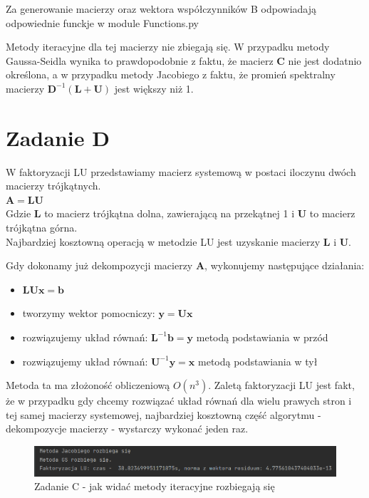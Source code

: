 \documentclass[fleqn]{article}
\begin{document}
    \noindent Za generowanie macierzy oraz wektora współczynników B odpowiadają
    odpowiednie funckje w module Functions.py

    \noindent Metody iteracyjne dla tej macierzy nie zbiegają się. W przypadku metody Gaussa-Seidla wynika
    to prawdopodobnie z faktu, że macierz \textbf{C} nie jest dodatnio określona, a w przypadku metody
    Jacobiego z faktu, że promień spektralny macierzy $\bm{D}^{-1}(\bm{L} + \bm{U})$ jest większy niż 1.

    \newpage
    \section{Zadanie D}
    W faktoryzacji LU przedstawiamy macierz systemową w postaci iloczynu dwóch macierzy trójkątnych. \\

    $\bm{A} = \bm{L}\bm{U}$ \\

    \noindent Gdzie \textbf{L} to macierz trójkątna dolna, zawierającą na przekątnej 1 i \textbf{U} to macierz trójkątna górna.\\
    Najbardziej kosztowną operacją w metodzie LU jest uzyskanie macierzy \textbf{L} i \textbf{U}.

    \noindent Gdy dokonamy już dekompozycji macierzy \textbf{A}, wykonujemy następujące działania:
    \begin{itemize}
        \item $\bm{L}\bm{U}\bm{x} = \bm{b}$
        \item tworzymy wektor pomocniczy: $\bm{y} = \bm{U}\bm{x}$
        \item rozwiązujemy układ równań: $\bm{L}^{-1}\bm{b} = \bm{y}$ metodą podstawiania w przód
        \item rozwiązujemy układ równań: $\bm{U}^{-1}\bm{y} = \bm{x}$ metodą podstawiania w tył
    \end{itemize}

    \noindent Metoda ta ma złożoność obliczeniową $O(n^3)$. Zaletą faktoryzacji LU jest fakt, 
    że w przypadku gdy chcemy rozwiązać układ równań dla wielu prawych stron i tej samej macierzy 
    systemowej, najbardziej kosztowną część algorytmu - dekompozycje macierzy - wystarczy 
    wykonać jeden raz.

    \begin{figure}[h]

        \centering
        \includegraphics[width=\textwidth]{LU.png}
        \centering
        \caption{Zadanie C - jak widać metody iteracyjne rozbiegają się}

    \end{figure}
\end{document}

